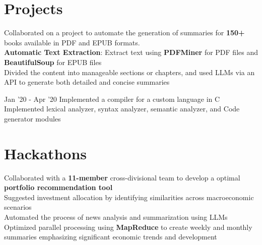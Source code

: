 \documentclass[a4paper]{Resume}
\begin{document}
\section{Projects}
\hrulefill

\pt Collaborated on a project to automate the generation of summaries for \textbf{150+} books available in PDF and EPUB formats. \\
\pt \textbf{Automatic Text Extraction}: Extract text using \textbf{PDFMiner} for PDF files and \textbf{BeautifulSoup} for EPUB files \\
\pt Divided the content into manageable sections or chapters, and used LLMs via an API to generate both detailed and concise summaries \\

\sectionsep{}

 {Jan '20 - Apr '20}
\pt Implemented a compiler for a custom language in C \\
\pt Implemented lexical analyzer, syntax analyzer, semantic analyzer, and Code generator modules \\

\sectionsep

\section{Hackathons}
\hrulefill

\pt Collaborated with a \textbf{11-member} cross-divisional team to develop a optimal \textbf{portfolio recommendation tool} \\
\pt Suggested investment allocation by identifying similarities across macroeconomic scenarios \\
\pt Automated the process of news analysis and summarization using LLMs \\
\pt Optimized parallel processing using \textbf{MapReduce} to create weekly and monthly summaries emphasizing significant economic trends and development \\
\end{document}

